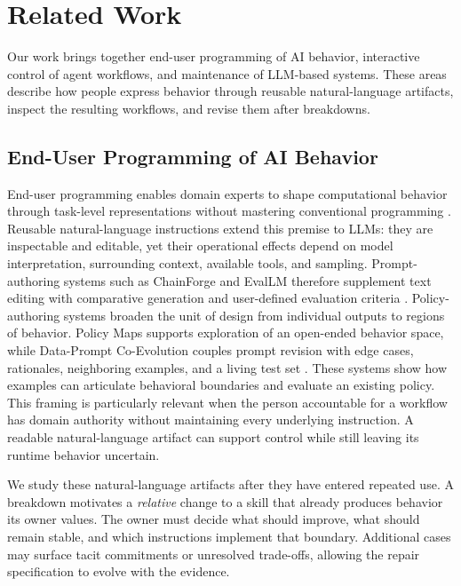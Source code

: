 \section{Related Work}
\label{sec:related-work}

Our work brings together end-user programming of AI behavior, interactive
control of agent workflows, and maintenance of LLM-based systems. These areas
describe how people express behavior through reusable natural-language
artifacts, inspect the resulting workflows, and revise them after breakdowns.

\subsection{End-User Programming of AI Behavior}
\label{sec:rw-eup}

End-user programming enables domain experts to shape computational behavior
through task-level representations without mastering conventional programming
\cite{ko2011state}. Reusable natural-language instructions extend this premise
to LLMs: they are inspectable and editable, yet their operational effects depend
on model interpretation, surrounding context, available tools, and sampling.
Prompt-authoring systems such as ChainForge and EvalLM therefore supplement
text editing with comparative generation and user-defined evaluation criteria
\cite{arawjo2024chainforge,kim2024evallm}. Policy-authoring systems broaden the
unit of design from individual outputs to regions of behavior. Policy Maps
supports exploration of an open-ended behavior space, while Data-Prompt
Co-Evolution couples prompt revision with edge cases, rationales, neighboring
examples, and a living test set \cite{lam2025policymaps,lee2026dataprompt}.
These systems show how examples can articulate behavioral boundaries and
evaluate an existing policy. This framing is particularly relevant when the
person accountable for a workflow has domain authority without maintaining
every underlying instruction. A readable natural-language artifact can support
control while still leaving its runtime behavior uncertain.

We study these natural-language artifacts after they have entered repeated use.
A breakdown motivates a \emph{relative} change to a skill that already produces
behavior its owner values. The owner must decide what should improve, what
should remain stable, and which instructions implement that boundary.
Additional cases may surface tacit commitments or unresolved trade-offs,
allowing the repair specification to evolve with the evidence.

